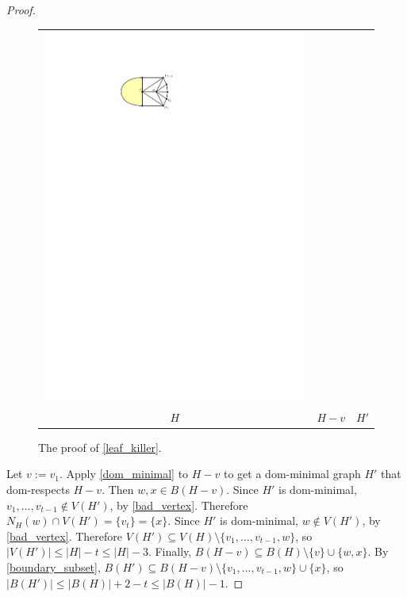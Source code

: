 \documentclass[a4paper,UKenglish,cleveref, autoref, thm-restate]{lipics-v2021}
\begin{document}
\begin{proof}
\begin{figure}[htbp]
\begin{tabular}{ccc}
      \includegraphics[page=3]{figs/killing_a_leaf} \\
      $H$ & $H-v$ & $H'$
    \end{tabular}
    \caption{The proof of \cref{leaf_killer}.}
    \label{killing_a_leaf}
  \end{figure}

  Let $v:=v_1$. Apply \cref{dom_minimal} to $H-v$ to get a dom-minimal graph $H'$ that dom-respects $H-v$.  Then $w,x\in B(H-v)$.  Since $H'$ is dom-minimal, $v_1,\ldots,v_{t-1}\not\in V(H')$, by \cref{bad_vertex}.  Therefore $N_H(w)\cap V(H')=\{v_t\}=\{x\}$. Since $H'$ is dom-minimal, $w\not\in V(H')$, by \cref{bad_vertex}. Therefore $V(H')\subseteq V(H)\setminus\{v_1,\ldots,v_{t-1},w\}$, so $|V(H')|\le |H|-t\le |H|-3$.  Finally, $B(H-v)\subseteq B(H)\setminus \{v\}\cup\{w,x\}$. By \cref{boundary_subset}, $B(H')\subseteq B(H-v)\setminus\{v_1,\ldots,v_{t-1},w\}\cup\{x\}$, so $|B(H')|\le |B(H)|+2-t\le |B(H)|-1$.
\end{proof}
\end{document}

